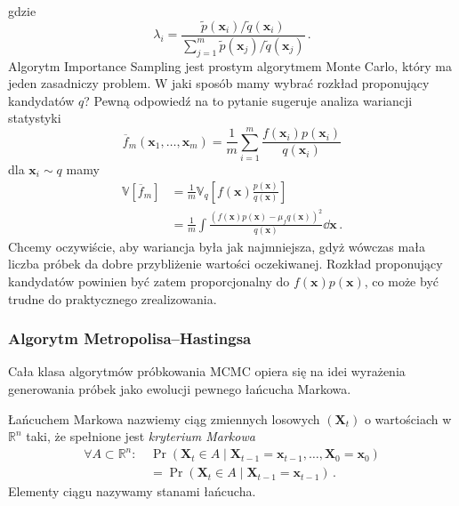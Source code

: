 \documentclass{myclass}
\begin{document}
gdzie
\[
\boxed{
\lambda_i = \frac{\tilde{p}(\bm{x}_i) / \tilde{q}(\bm{x}_i)}{\sum_{j=1}^m \tilde{p}(\bm{x}_j) / \tilde{q}(\bm{x}_j) }\,.
}
\]
Algorytm Importance Sampling jest prostym algorytmem Monte Carlo, który ma jeden zasadniczy problem.
W jaki sposób mamy wybrać rozkład proponujący kandydatów \(q\)? Pewną odpowiedź na to pytanie
sugeruje analiza wariancji statystyki 
\[
\overline{f}_m(\bm{x}_1,\ldots,\bm{x}_m) = \frac{1}{m}\sum_{i=1}^m \frac{f(\bm{x}_i)p(\bm{x}_i)}{q(\bm{x}_i)}
\]
dla \(\bm{x}_i \sim q\) mamy
\[
\begin{split}
\mathbb{V}[\overline{f}_m] &= \frac{1}{m}\mathbb{V}_q\left[f(\bm{x})\frac{p(\bm{x})}{q(\bm{x})}\right] \\
&= \frac{1}{m}\int\frac{(f(\bm{x})p(\bm{x}) - \mu_fq(\bm{x}))^2}{q(\bm{x})}\dd{\bm{x}}\,.
\end{split}
\]
Chcemy oczywiście, aby wariancja była jak najmniejsza, gdyż wówczas mała liczba próbek da dobre
przybliżenie wartości oczekiwanej. Rozkład proponujący kandydatów powinien być zatem proporcjonalny
do \(f(\bm{x})p(\bm{x})\), co może być trudne do praktycznego zrealizowania.

\subsubsection{Algorytm Metropolisa--Hastingsa}

Cała klasa algorytmów próbkowania MCMC opiera się na idei wyrażenia generowania próbek jako ewolucji
pewnego łańcucha Markowa.

Łańcuchem Markowa nazwiemy ciąg zmiennych losowych \((\bm{X}_t)\) o wartościach w \(\mathbb{R}^n\)
taki, że spełnione jest \emph{kryterium Markowa}
\[
\begin{split}
\forall A \subset \mathbb{R}^n :\, &\Pr(\bm{X}_t \in A \mid \bm{X}_{t-1} = \bm{x}_{t-1}, \ldots, \bm{X}_0 = \bm{x}_0) \\
&= \Pr(\bm{X}_t \in A \mid \bm{X}_{t-1} = \bm{x}_{t-1})\,.
\end{split}
\]
Elementy ciągu nazywamy stanami łańcucha.
\end{document}
